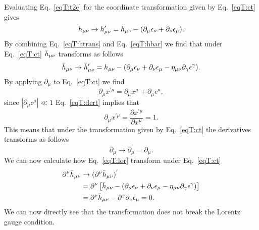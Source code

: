 Evaluating Eq.~\ref{eqT:t2c} for the coordinate transformation given by Eq.~\ref{eqT:ct} gives
\begin{equation} \label{eqT:htrans}
h_{\mu\nu} \rightarrow h'_{\mu\nu} = h_{\mu\nu} - (\partial_{\mu} \epsilon_{\nu} + \partial_{\nu} \epsilon_{\mu}). 
\end{equation}
By combining Eq.~\ref{eqT:htrans} and Eq.~\ref{eqT:hbar} we find that under Eq.~\ref{eqT:ct} $\bar{h}_{\mu\nu}$ transforms as follows
\begin{equation} \label{eqT:hbartrans}
\bar{h}_{\mu\nu} \rightarrow \bar{h}'_{\mu\nu} =  {h}_{\mu\nu} - (\partial_{\mu} \epsilon_{\nu} + \partial_{\nu} \epsilon_{\mu} - \eta_{\mu\nu}\partial_{\gamma} \epsilon^{\gamma}). 
\end{equation}
By applying  $\partial_{\mu}$ to Eq.~\ref{eqT:ct} we find
\begin{equation} \label{eqT:dert}
\partial_{\mu} x^{'\mu} = \partial_{\mu} x^{\mu} + \partial_{\mu} \epsilon^{\mu},
\end{equation}
since $|\partial_{\mu} \epsilon^{\mu}| \ll 1$ Eq.~\ref{eqT:dert} implies that
\begin{equation}
\partial_{\mu} x^{'\mu} = \frac{\partial x^{'\mu} }{\partial x^{\mu}} = 1.
\end{equation}
This means that under the transformation given by Eq.~\ref{eqT:ct} the derivatives
transforms as follows
\begin{equation} \label{eqT:dert2}
\partial_{\mu} \rightarrow \partial_{\mu}^{'} = \partial_{\mu}.
\end{equation}
We can now calculate how Eq.~\ref{eqT:lor} transform under Eq.~\ref{eqT:ct}
\begin{align} \label{eqT:lort}
\partial^{\nu} \bar{h}_{\mu\nu} & \rightarrow (\partial^{\nu} \bar{h}_{\mu\nu})^{'} \\ \nonumber
&= \partial^{\nu} \left [ \bar{h}_{\mu\nu} - (\partial_{\mu} \epsilon_{\nu} + \partial_{\nu} \epsilon_{\mu} - \eta_{\mu\nu}\partial_{\gamma} \epsilon^{\gamma}) \right ] \\
&= \partial^{\nu} \bar{h}_{\mu\nu} - \partial^{\gamma} \partial_{\gamma} \epsilon_{\mu} = 0. \nonumber
\end{align}
We can now directly see that the transformation does not break the Lorentz gauge condition.

